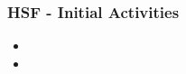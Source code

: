 \begin{frame}
\frametitle{HSF - Initial Activities}
\begin{itemize}
\item 
\item 
\end{itemize}

\end{frame}


